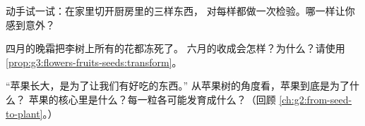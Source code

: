 \begin{exercise}[$\star$]\label{exo:g3:flowers-fruits-seeds:8}
动手试一试：在家里切开厨房里的三样东西，
对每样都做一次检验。哪一样让你感到意外？
\end{exercise}

\begin{exercise}[$\star\star$]\label{exo:g3:flowers-fruits-seeds:9}
四月的晚霜把李树上所有的花都冻死了。
六月的收成会怎样？为什么？请使用
\cref{prop:g3:flowers-fruits-seeds:transform}。
\end{exercise}

\begin{exercise}[$\star\star$]\label{exo:g3:flowers-fruits-seeds:10}
“苹果长大，是为了让我们有好吃的东西。”
从苹果树的角度看，苹果到底是为了什么？
苹果的核心里是什么？每一粒各可能发育成什么？（回顾
\cref{ch:g2:from-seed-to-plant}。）
\end{exercise}
